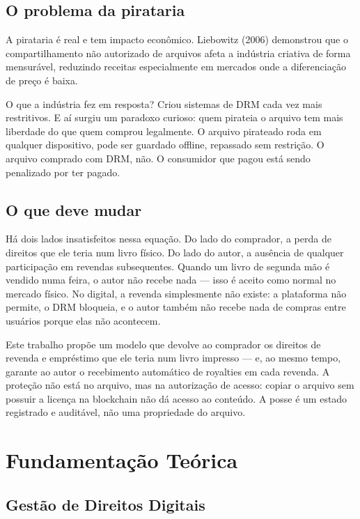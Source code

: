 \documentclass[12pt]{article}
\begin{document}
\subsection*{O problema da pirataria}

A pirataria é real e tem impacto econômico. Liebowitz (2006) demonstrou que o compartilhamento não autorizado de arquivos afeta a indústria criativa de forma mensurável, reduzindo receitas especialmente em mercados onde a diferenciação de preço é baixa.

O que a indústria fez em resposta? Criou sistemas de DRM cada vez mais restritivos. E aí surgiu um paradoxo curioso: quem pirateia o arquivo tem mais liberdade do que quem comprou legalmente. O arquivo pirateado roda em qualquer dispositivo, pode ser guardado offline, repassado sem restrição. O arquivo comprado com DRM, não. O consumidor que pagou está sendo penalizado por ter pagado.

\subsection*{O que deve mudar}

Há dois lados insatisfeitos nessa equação. Do lado do comprador, a perda de direitos que ele teria num livro físico. Do lado do autor, a ausência de qualquer participação em revendas subsequentes. Quando um livro de segunda mão é vendido numa feira, o autor não recebe nada — isso é aceito como normal no mercado físico. No digital, a revenda simplesmente não existe: a plataforma não permite, o DRM bloqueia, e o autor também não recebe nada de compras entre usuários porque elas não acontecem.

Este trabalho propõe um modelo que devolve ao comprador os direitos de revenda e empréstimo que ele teria num livro impresso — e, ao mesmo tempo, garante ao autor o recebimento automático de royalties em cada revenda. A proteção não está no arquivo, mas na autorização de acesso: copiar o arquivo sem possuir a licença na blockchain não dá acesso ao conteúdo. A posse é um estado registrado e auditável, não uma propriedade do arquivo.

\section{Fundamentação Teórica}

\subsection{Gestão de Direitos Digitais}
\end{document}
